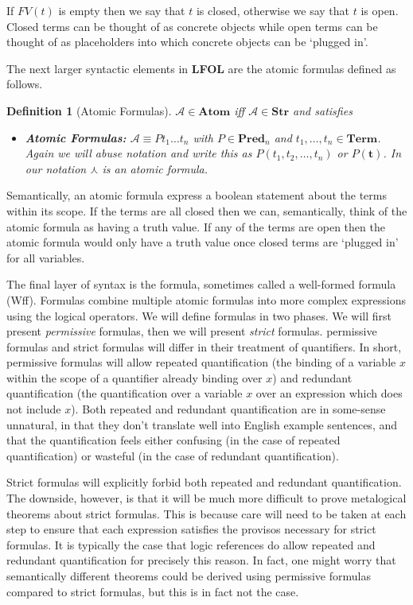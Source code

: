\documentclass[12pt]{article}
\theoremstyle{break}
\newtheorem{definition}{Definition}[section]
\theoremstyle{break}
\theoremstyle{break}
\theoremstyle{break}
\newcommand{\bv}[1]{\boldsymbol{#1}}
\newcommand{\mc}[1]{\mathcal{#1}}
\begin{document}
If $FV(t)$ is empty then we say that $t$ is closed, otherwise we say that $t$ is open.
Closed terms can be thought of as concrete objects while open terms can be thought of as placeholders into which concrete objects can be `plugged in'.

The next larger syntactic elements in \textbf{LFOL} are the atomic formulas defined as follows.

\begin{definition}[Atomic Formulas]
$\mc{A} \in \textbf{Atom}$ iff $\mc{A} \in \textbf{Str}$ and satisfies

\begin{itemize}
\item{\textbf{Atomic Formulas:} $\mc{A} \equiv Pt_1\ldots t_n$ with $P\in \textbf{Pred}_n$ and $t_1, \ldots, t_n \in \textbf{Term}$. Again we will abuse notation and write this as $P(t_1,t_2,\ldots,t_n)$ or $P(\bv{t})$. In our notation $\curlywedge$ is an atomic formula.}
\end{itemize}
\end{definition}

Semantically, an atomic formula express a boolean statement about the terms within its scope.
If the terms are all closed then we can, semantically, think of the atomic formula as having a truth value.
If any of the terms are open then the atomic formula would only have a truth value once closed terms are `plugged in' for all variables.

The final layer of syntax is the formula, sometimes called a well-formed formula  (Wff).
Formulas combine multiple atomic formulas into more complex expressions using the logical operators.
We will define formulas in two phases.
We will first present \textit{permissive} formulas, then we will present \textit{strict} formulas. 
permissive formulas and strict formulas will differ in their treatment of quantifiers.
In short, permissive formulas will allow repeated quantification (the binding of a variable $x$ within the scope of a quantifier already binding over $x$) and redundant quantification (the quantification over a variable $x$ over an expression which does not include $x$). 
Both repeated and redundant quantification are in some-sense unnatural, in that they don't translate well into English example sentences, and that the quantification feels either confusing (in the case of repeated quantification) or wasteful (in the case of redundant quantification).

Strict formulas will explicitly forbid both repeated and redundant quantification.
The downside, however, is that it will be much more difficult to prove metalogical theorems about strict formulas.
This is because care will need to be taken at each step to ensure that each expression satisfies the provisos necessary for strict formulas.
It is typically the case that logic references do allow repeated and redundant quantification for precisely this reason.
In fact, one might worry that semantically different theorems could be derived using permissive formulas compared to strict formulas, but this is in fact not the case.
\end{document}
